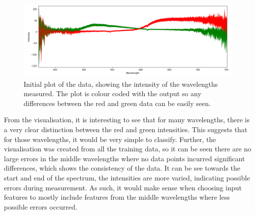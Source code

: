 \documentclass{article}
\begin{document}
\begin{figure}[H]
\centering
\includegraphics[width=1\textwidth, keepaspectratio]{imgs/binary-visual.png}
\caption{Initial plot of the data, showing the intensity of the wavelengths measured. The plot is colour coded with the output so any differences between the red and green data can be easily seen.}
\label{fig:binary-visual}
\end{figure}
\noindent
From the visualisation, it is interesting to see that for many wavelengths, there is a very clear distinction between the red and green intensities. This suggests that for those wavelengths, it would be very simple to classify. Further, the visualisation was created from all the training data, so it can be seen there are no large errors in the middle wavelengths where no data points incurred significant differences, which shows the consistency of the data. It can be see towards the start and end of the spectrum, the intensities are more varied, indicating possible errors during measurement. As such, it would make sense when choosing input features to mostly include features from the middle wavelengths where less possible errors occurred. 
\end{document}
